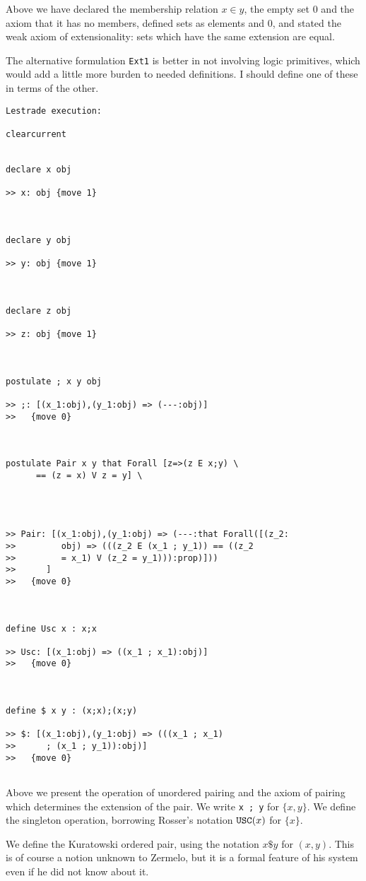\documentclass[12pt]{article}
\begin{document}
Above we have declared the membership relation $x \in y$, the empty set 0 and the axiom that it has no members, defined sets as elements and 0, and stated the weak axiom of extensionality:  sets which have the same extension are equal.

The alternative formulation {\tt Ext1} is better in not involving logic primitives, which would add a little more burden to needed definitions.  I should define one of these in terms of the other.

\begin{verbatim}Lestrade execution:

clearcurrent


declare x obj

>> x: obj {move 1}



declare y obj

>> y: obj {move 1}



declare z obj

>> z: obj {move 1}



postulate ; x y obj

>> ;: [(x_1:obj),(y_1:obj) => (---:obj)]
>>   {move 0}



postulate Pair x y that Forall [z=>(z E x;y) \
      == (z = x) V z = y] \
   



>> Pair: [(x_1:obj),(y_1:obj) => (---:that Forall([(z_2:
>>         obj) => (((z_2 E (x_1 ; y_1)) == ((z_2
>>         = x_1) V (z_2 = y_1))):prop)]))
>>      ]
>>   {move 0}



define Usc x : x;x

>> Usc: [(x_1:obj) => ((x_1 ; x_1):obj)]
>>   {move 0}



define $ x y : (x;x);(x;y)

>> $: [(x_1:obj),(y_1:obj) => (((x_1 ; x_1)
>>      ; (x_1 ; y_1)):obj)]
>>   {move 0}


\end{verbatim}

Above we present the operation of unordered pairing and the axiom of pairing which determines the extension of the pair.  We write {\tt x ; y} for $\{x,y\}$.  We define
 the singleton operation, borrowing Rosser's notation ${\tt USC}(x)$ for $\{x\}$.

We define the Kuratowski ordered pair, using the notation $x \$ y$ for $(x,y)$.  This is of course a notion unknown to Zermelo, but it is a formal feature of his system even if he did not know about it.
\end{document}
